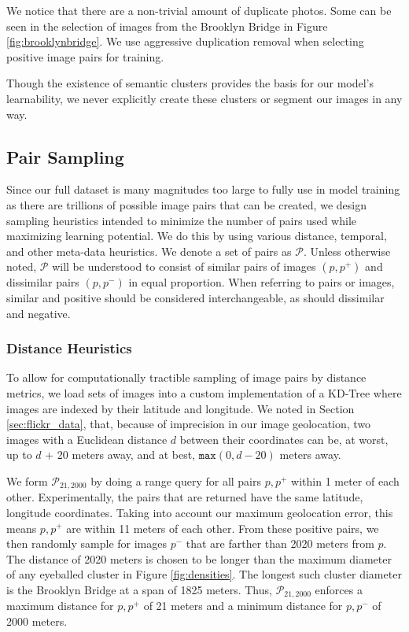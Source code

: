 We notice that there are a non-trivial amount of duplicate photos. Some can be seen in the selection of images from the Brooklyn Bridge in Figure \ref{fig:brooklynbridge}. We use aggressive duplication removal when selecting positive image pairs for training. 

Though the existence of semantic clusters provides the basis for our model's learnability, we never explicitly create these clusters or segment our images in any way.

\subsection{Pair Sampling}\label{sec:pair_sampling}
Since our full dataset is many magnitudes too large to fully use in model training as there are trillions of possible image pairs that can be created, we design sampling heuristics intended to minimize the number of pairs used while maximizing learning potential. We do this by using various distance, temporal, and other meta-data heuristics. We denote a set of pairs as $\mathcal{P}$. Unless otherwise noted, $\mathcal{P}$ will be understood to consist of similar pairs of images $(p, p^+)$ and dissimilar pairs $(p, p^-)$ in equal proportion. When referring to pairs or images, similar and positive should be considered interchangeable, as should dissimilar and negative. 

\subsubsection{Distance Heuristics}
To allow for computationally tractible sampling of image pairs by distance metrics, we load sets of images into a custom implementation of a KD-Tree where images are indexed by their latitude and longitude. We noted in Section \ref{sec:flickr_data}, that, because of imprecision in our image geolocation, two images with a Euclidean distance $d$ between their coordinates can be, at worst, up to $d$ + 20 meters away, and at best, $\texttt{max}(0, d-20)$ meters away.

We form $\mathcal{P}_{21, 2000}$ by doing a range query for all pairs $p, p^+$ within 1 meter of each other. Experimentally, the pairs that are returned have the same latitude, longitude coordinates. Taking into account our maximum geolocation error, this means $p, p^+$ are within 11 meters of each other. From these positive pairs, we then randomly sample for images $p^-$ that are farther than 2020 meters from $p$. The distance of 2020 meters is chosen to be longer than the maximum diameter of any eyeballed cluster in Figure \ref{fig:densities}. The longest such cluster diameter is the Brooklyn Bridge at a span of 1825 meters. Thus, $\mathcal{P}_{21,2000}$ enforces a maximum distance for $p, p^+$ of 21 meters and a minimum distance for $p, p^-$ of 2000 meters.

